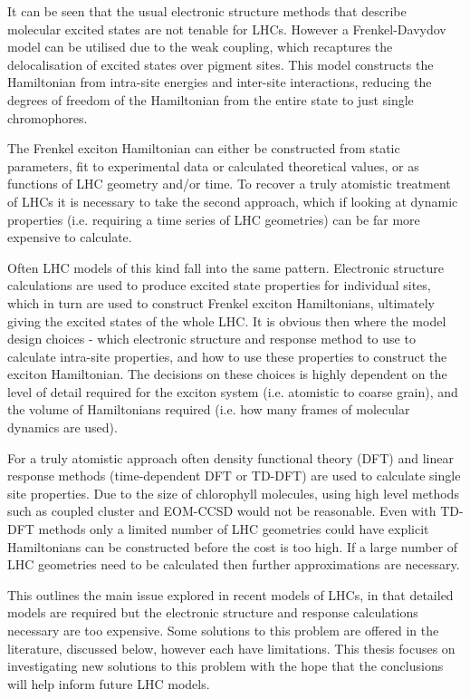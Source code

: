 It can be seen that the usual electronic structure methods that describe molecular 
excited states are not tenable for LHCs. However a Frenkel-Davydov model can be 
utilised due to the weak coupling, which recaptures the delocalisation of excited
states over pigment sites. This model constructs the Hamiltonian from intra-site energies and
inter-site interactions, reducing the degrees of freedom of the Hamiltonian from
the entire state to just single chromophores.

The Frenkel exciton Hamiltonian can either be constructed from static parameters,
fit to experimental data or calculated theoretical values, or as functions of LHC 
geometry and/or time. To recover a truly atomistic treatment of LHCs it is necessary 
to take the second approach, which if looking at dynamic properties (i.e. requiring
a time series of LHC geometries) can be far more expensive to calculate.

Often LHC models of this kind fall into the same pattern. Electronic structure calculations
are used to produce excited state properties for individual sites, which in turn 
are used to construct Frenkel exciton Hamiltonians, ultimately giving the excited 
states of the whole LHC. It is obvious then where the model design choices - which 
electronic structure and response method to use to calculate intra-site properties,
and how to use these properties to construct the exciton Hamiltonian. The decisions
on these choices is highly dependent on the level of detail required for the exciton 
system (i.e. atomistic to coarse grain), and the volume of Hamiltonians required 
(i.e. how many frames of molecular dynamics are used). 

For a truly atomistic approach often density functional theory (DFT) and linear 
response methods (time-dependent DFT or TD-DFT) are used to calculate single site
properties. Due to the size of chlorophyll molecules, using high level methods such 
as coupled cluster and EOM-CCSD would not be reasonable. Even with TD-DFT methods
only a limited number of LHC geometries could have explicit Hamiltonians can be 
constructed before the cost is too high. If a large number of LHC geometries need 
to be calculated then further approximations are necessary.

This outlines the main issue explored in recent models of LHCs, in that detailed 
models are required but the electronic structure and response calculations necessary
are too expensive. Some solutions to this problem are offered in the literature, 
discussed below, however each have limitations. This thesis focuses on investigating
new solutions to this problem with the hope that the conclusions will help inform
future LHC models.

